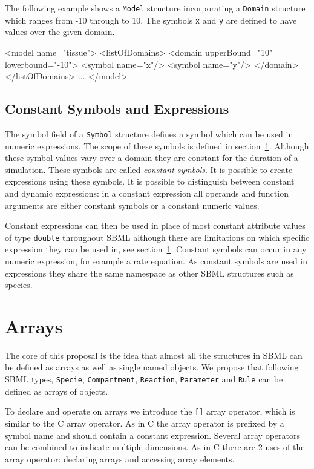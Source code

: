 \documentclass{cekarticle}
\begin{document}
The following example shows a \texttt{Model} structure
incorporating a \texttt{Domain} structure which ranges from -10
through to 10.  The symbols \texttt{x} and \texttt{y} are defined
to have values over the given domain.

\begin{example}
<model name="tissue">
    <listOfDomains>
        <domain upperBound="10" lowerbound="-10">
            <symbol name="x"/>
            <symbol name="y"/>
        </domain>
    </listOfDomains>
    ...
</model>
\end{example}

\subsection{Constant Symbols and Expressions}
\label{sec:constantExpressions}

The symbol field of a \texttt{Symbol} structure defines a symbol
which can be used in numeric expressions.  The scope of these
symbols is defined in section~\ref{sec:arrays}. Although these
symbol values vary over a domain they are constant for the
duration of a simulation.  These symbols are called
\emph{constant symbols}. It is possible to create expressions
using these symbols. It is possible to distinguish between
constant and dynamic expressions: in a constant expression all
operands and function arguments are either constant symbols or a
constant numeric values.

Constant expressions can then be used in place of most constant
attribute values of type \texttt{double} throughout SBML although
there are limitations on which specific expression they can be
used in, see section~\ref{sec:arrays}. Constant symbols can occur
in any numeric expression, for example a rate equation. As
constant symbols are used in expressions they share the same
namespace as other SBML structures such as species.

\section{Arrays}
\label{sec:arrays}

The core of this proposal is the idea that almost all the
structures in SBML can be defined as arrays as well as single
named objects.  We propose that following SBML types,
\texttt{Specie}, \texttt{Compartment}, \texttt{Reaction},
\texttt{Parameter} and \texttt{Rule} can be defined as arrays of
objects.

To declare and operate on arrays we introduce the \texttt{[]}
array operator, which is similar to the C array operator.  As in
C the array operator is prefixed by a symbol name and should
contain a constant expression.  Several array operators can be
combined to indicate multiple dimensions.   As in C there are 2
uses of the array operator: declaring arrays and accessing array
elements.
\end{document}
